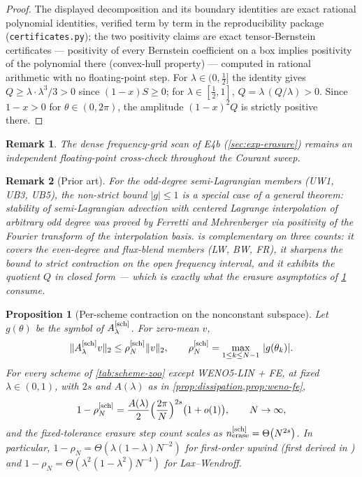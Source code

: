 \documentclass[pdflatex,sn-mathphys-num]{sn-jnl}%
\theoremstyle{thmstyleone}%
\newtheorem{proposition}{Proposition}%
\theoremstyle{thmstyletwo}%
\newtheorem{remark}{Remark}%
\theoremstyle{thmstylethree}%
\newcommand{\Asch}{A^{[\rm sch]}_\lambda}
\begin{document}
\begin{proof}
The displayed decomposition and its boundary identities are exact rational polynomial identities, verified term by term in the reproducibility package (\texttt{certificates.py}); the two positivity claims are exact tensor-Bernstein certificates --- positivity of every Bernstein coefficient on a box implies positivity of the polynomial there (convex-hull property) --- computed in rational arithmetic with no floating-point step.
For $\lambda\in(0,\tfrac12]$ the identity gives $Q\ge\lambda\cdot\lambda^3/3>0$ since $(1-x)S\ge0$; for $\lambda\in[\tfrac12,1]$, $Q=\lambda\,(Q/\lambda)>0$.
Since $1-x>0$ for $\theta\in(0,2\pi)$, the amplitude $(1-x)^2Q$ is strictly positive there.
\end{proof}

\begin{remark}
The dense frequency-grid scan of E4b (\cref{sec:exp-erasure}) remains an independent floating-point cross-check throughout the Courant sweep.
\end{remark}

\begin{remark}[Prior art]\label{rem:sl-stability-prior}
For the odd-degree semi-Lagrangian members (UW1, UB3, UB5), the non-strict bound $|g|\le1$ is a special case of a general theorem: stability of semi-Lagrangian advection with centered Lagrange interpolation of \emph{arbitrary} odd degree was proved by Ferretti and Mehrenberger \cite{FerrettiMehrenberger2020} via positivity of the Fourier transform of the interpolation basis.
 is complementary on three counts: it covers the even-degree and flux-blend members (LW, BW, FR), it sharpens the bound to \emph{strict} contraction on the open frequency interval, and it exhibits the quotient $Q$ in closed form --- which is exactly what the erasure asymptotics of \cref{prop:contraction-general} consume.
\end{remark}

\begin{proposition}[Per-scheme contraction on the nonconstant subspace]\label{prop:contraction-general}
Let $g(\theta)$ be the symbol of $\Asch$.
For zero-mean $v$, \[ \|\Asch v\|_2\le\rho_N^{[\rm sch]}\|v\|_2, \qquad \rho_N^{[\rm sch]} = \max_{1\le k\le N-1}\,|g(\theta_k)| . \]
For every scheme of \cref{tab:scheme-zoo} except WENO5-LIN + FE, at fixed $\lambda\in(0,1)$, with $2s$ and $A(\lambda)$ as in \cref{prop:dissipation,prop:weno-fe}, \[ 1-\rho_N^{[\rm sch]} = \frac{A(\lambda)}{2}\Bigl(\frac{2\pi}{N}\Bigr)^{2s}\bigl(1+o(1)\bigr), \qquad N\to\infty, \] and the fixed-tolerance erasure step count scales as $n_{\rm erase}^{[\rm sch]}=\Theta\bigl(N^{2s}\bigr)$.
In particular, $1-\rho_N=\Theta(\lambda(1-\lambda)N^{-2})$ for first-order upwind (first derived in \cite{PolemitisChristakisDrikakis2026FVerasure}) and $1-\rho_N=\Theta(\lambda^2(1-\lambda^2)N^{-4})$ for Lax--Wendroff.
\end{proposition}
\end{document}
